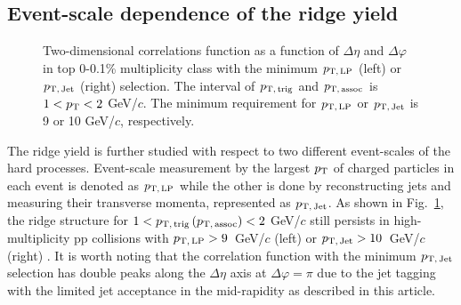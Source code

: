 \subsection{Event-scale dependence of the ridge yield}
\begin{figure}[h!]
	\centering
	\caption{ Two-dimensional correlations function as a function of $\Delta\eta$ and $\Delta\varphi$ in top 0-0.1\% multiplicity class with the minimum $p_\mathrm{T,\,LP}$ (left) or $p_\mathrm{T,\,Jet}$ (right) selection. The interval of $p_\mathrm{T,\,trig}$ and $p_\mathrm{T,\,assoc}$ is $1<p_\mathrm{T}<2$ GeV/$c$. The minimum requirement for $p_\mathrm{T,\,LP}$ or $p_\mathrm{T,\,Jet}$ is 9 or 10 GeV/$c$, respectively. }
	\label{fig:PlotCorrHMTSel}
\end{figure}

The ridge yield is further studied with respect to two different event-scales of the hard processes. Event-scale measurement by the largest $p_\mathrm{T}$ of charged particles in each event is denoted as $p_\mathrm{T,\,LP}$ while the other is done by reconstructing jets and measuring their transverse momenta, represented as $p_\mathrm{T,\,Jet}$. As shown in Fig.~\ref{fig:PlotCorrHMTSel}, the ridge structure for $1< p_\mathrm{T,\,trig}\,(p_\mathrm{T,\,assoc}) <2$ GeV/$c$ still persists in high-multiplicity pp collisions with $p_\mathrm{T,\,LP}>9$~GeV/$c$ (left) or $p_\mathrm{T,\,Jet}>10$~GeV/$c$ (right) .  %
It is worth noting that the correlation function with the minimum $p_\mathrm{T,\,Jet}$ selection has double peaks along the $\Delta\eta$ axis at $\Delta\varphi = \pi$ due to the jet tagging with the limited jet acceptance in the mid-rapidity as described in this article.

